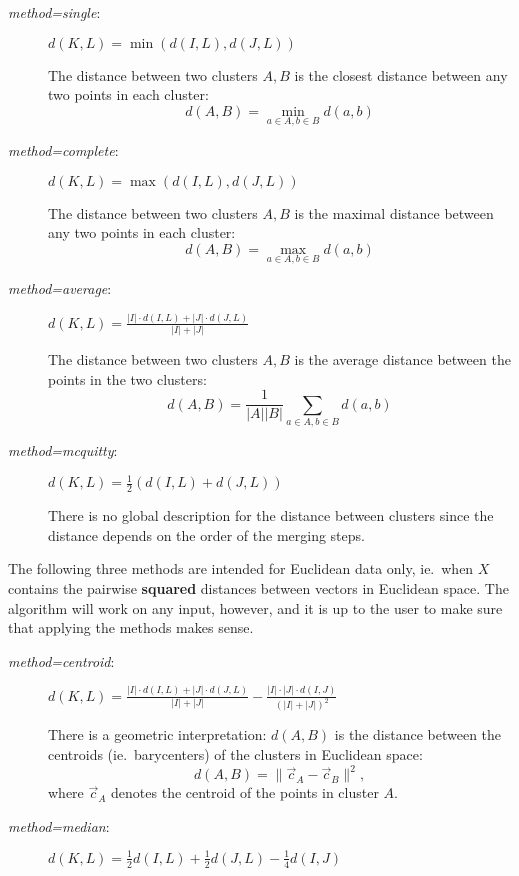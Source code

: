 \documentclass[fontsize=10pt,paper=letter,BCOR=-6mm,DIV=8]{scrartcl}
\makeatletter
\newcommand*\q{\textquotesingle}
\newenvironment{methods}{%
  \list{}{\labelwidth\z@
    \itemindent-\leftmargin
    \let\makelabel\methodslabel}%
}{%
  \endlist
}
\newcommand*{\methodslabel}[1]{%
  \hbox to \textwidth{\hspace{\labelsep}%
  \normalfont\bfseries\ttfamily
  #1\hskip-\labelsep\hfill}%
}
\makeatother
\begin{document}
\begin{methods}
\begin{description}
\item [\normalfont\textit{method=\q single\q}:]
$\displaystyle d(K,L) = \min(d(I,L), d(J,L))$

The distance between two clusters $A,B$ is the closest distance between any two points in each cluster:
\[
 d(A,B)=\min_{a\in A, b\in B}d(a,b)
\]

\item [\normalfont\textit{method=\q complete\q}:]
$\displaystyle d(K,L) = \max(d(I,L), d(J,L))$

The distance between two clusters $A,B$ is the maximal distance between any two points in each cluster:
\[
 d(A,B)=\max_{a\in A, b\in B}d(a,b)
\]

\item [\normalfont\textit{method=\q average\q}:]
$\displaystyle d(K,L) = \frac{|I|\cdot d(I,L)+|J|\cdot d(J,L)}{|I|+|J|}$

The distance between two clusters $A,B$ is the average distance between the points in the two clusters:
\[
 d(A,B)=\frac1{|A||B|}\sum_{a\in A, b\in B}d(a,b)
\]

\item [\normalfont\textit{method=\q mcquitty\q}:]
$\displaystyle d(K,L) = \tfrac12(d(I,L)+d(J,L))$

There is no global description for the distance between clusters since the distance depends on the order of the merging steps.
\end{description}

The following three methods are intended for Euclidean data only, ie.\ when $X$ contains the pairwise \textbf{squared} distances between vectors in Euclidean space. The algorithm will work on any input, however, and it is up to the user to make sure that applying the methods makes sense.

\begin{description}
\item [\normalfont\textit{method=\q centroid\q}:]
$\displaystyle d(K,L) = \frac{|I|\cdot d(I,L)+|J|\cdot d(J,L)}{|I|+|J|}-\frac{|I|\cdot|J|\cdot d(I,J)}{(|I|+|J|)^2}$

There is a geometric interpretation: $d(A,B)$ is the distance between the centroids (ie.\ barycenters) of the clusters in Euclidean space:
\[
  d(A,B) = \|\vec c_A-\vec c_B\|^2,
\]
where $\vec c_A$ denotes the centroid of the points in cluster $A$.

\item [\normalfont\textit{method=\q median\q}:]
$\displaystyle d(K,L) = \tfrac12 d(I,L)+\tfrac12 d(J,L)-\tfrac14 d(I,J)$


\end{description}
\end{methods}
\end{document}

